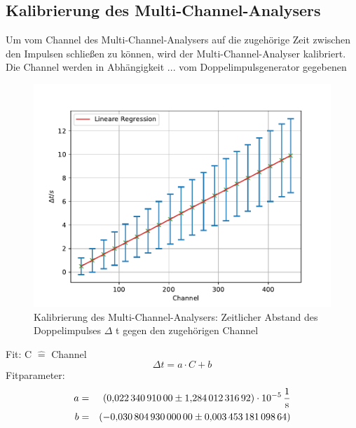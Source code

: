 \subsection{Kalibrierung des Multi-Channel-Analysers}
Um vom Channel des Multi-Channel-Analysers auf die zugehörige Zeit zwischen den Impulsen schließen zu können, wird der Multi-Channel-Analyser kalibriert.
Die Channel werden in Abhängigkeit ... vom Doppelimpulsgenerator gegebenen 

\begin{figure}[h!]
  \centering
  \includegraphics[width=\textwidth]{figkalibrierung.pdf}
  \caption{Kalibrierung des Multi-Channel-Analysers: Zeitlicher Abstand des Doppelimpulses $\Delta$ t gegen den zugehörigen Channel}
  \label{fig:kalibrierung}
\end{figure}
Fit: C $\widehat{=}$ Channel
\begin{equation*}
\Delta t = a \cdot C + b
\end{equation*}
Fitparameter:
\begin{align*}
a  &=&  \SI{ 0.02234091 \pm 1.28401231692e-05}{\frac{1}{s}}  \\
b  &=&  \SI{-0.03080493 \pm 0.00345318109864 }{}  \\
\end{align*}

\FloatBarrier


